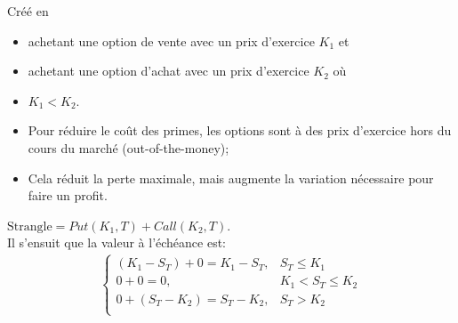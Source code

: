 \documentclass[10pt, french]{article}
\begin{document}
\begin{multicols*}{2}
\begin{definitionNOHFILL}
\begin{center}
\begin{tikzpicture}[x=0.75pt,y=0.75pt,yscale=-1,xscale=1]
\end{tikzpicture}
\end{center}
\end{definitionNOHFILL}


\begin{definitionNOHFILL}
Créé en 
\begin{itemize}[leftmargin = *]
	\item	achetant une option de vente avec un prix d'exercice $K_{1}$ et 
	\item	achetant une option d'achat avec un prix d'exercice $K_{2}$ où 
	\item	$K_{1} < K_{2}$.
\end{itemize}

\begin{distributions}[Contexte]
\begin{itemize}[leftmargin = *]
	\item	Pour réduire le coût des primes, les options sont à des prix d'exercice hors du cours du marché (out-of-the-money);
	\item	Cela réduit la perte maximale, mais augmente la variation nécessaire pour faire un profit.
\end{itemize}
\end{distributions}

$\text{Strangle} = Put(K_1, T) + Call(K_2, T)$.\\

Il s'ensuit que la valeur à l'échéance est:
\begin{align*}
		\begin{cases}
		(K_{1} - S_{T})	+	0	=	K_{1} - S_{T},	&	S_{T} \le K_{1}	\\
		0	+	0	=	0,	&	K_{1} < S_{T} \le K_{2} 	\\
		0	+	(S_{T} - K_{2})	=	S_{T} - K_{2},	&	S_{T} >	K_{2}	\\
		\end{cases}
\end{align*}

\begin{center}
\end{center}
\end{definitionNOHFILL}
\end{multicols*}
\end{document}
